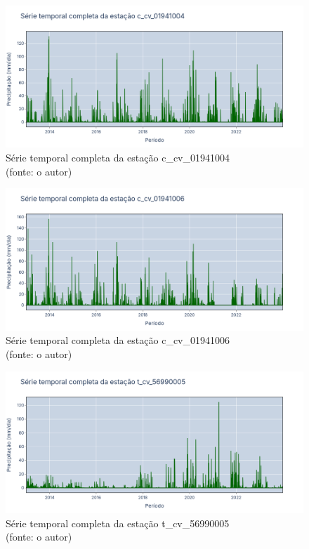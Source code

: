\begin{figure}[!h]
	\centering
	\includegraphics[scale=0.25]{Figuras/rio_doce/doceSerieCompleta_c_cv_01941004.png}
	\caption{Série temporal completa da estação c\_cv\_01941004\\(fonte: o autor)}
	\label{fig:doceSerieCompleta_c_cv_01941004}
\end{figure}

\begin{figure}[!h]
	\centering
	\includegraphics[scale=0.25]{Figuras/rio_doce/doceSerieCompleta_c_cv_01941006.png}
	\caption{Série temporal completa da estação c\_cv\_01941006\\(fonte: o autor)}
	\label{fig:doceSerieCompleta_c_cv_01941006}
\end{figure}

\begin{figure}[!h]
	\centering
	\includegraphics[scale=0.25]{Figuras/rio_doce/doceSerieCompleta_t_cv_56990005.png}
	\caption{Série temporal completa da estação t\_cv\_56990005\\(fonte: o autor)}
	\label{fig:doceSerieCompleta_t_cv_56990005}
\end{figure}

